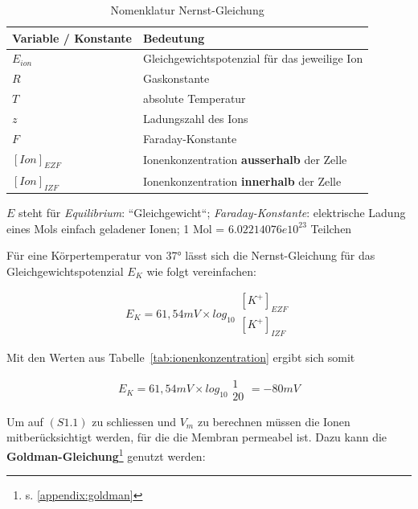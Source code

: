 {  {\renewcommand{\arraystretch}{1.5}%
\begin{table} %
 \centering
 \begin{tabular}{l |l }
  \textbf{Variable / Konstante} & \textbf{Bedeutung}  \\
  \hline
  $E_{ion}$            & Gleichgewichtspotenzial für das jeweilige Ion \\
  $R$                  & Gaskonstante \\
  $T$                  & absolute Temperatur \\
  $z$                  & Ladungszahl des Ions \\
  $F$                  & Faraday-Konstante \\
  $[Ion]_{EZF}$        & Ionenkonzentration \textbf{ausserhalb} der Zelle \\
  $[Ion]_{IZF}$        & Ionenkonzentration \textbf{innerhalb} der Zelle \\
 \end{tabular}
 \caption{Nomenklatur Nernst-Gleichung}
 \label{tab:nernstkonstanten}
 \small
  $E$ steht für \textit{Equilibrium}: ``Gleichgewicht``; \textit{Faraday-Konstante}: elektrische Ladung eines Mols einfach geladener Ionen; 1 Mol = $6.02214076e10^{23}$ Teilchen

\end{table}

\noindent
Für eine Körpertemperatur von 37° lässt sich die Nernst-Gleichung für das Gleichgewichtspotenzial $E_K$ wie folgt vereinfachen:

\begin{equation}
 E_{K} = 61,54 mV  \times log_{10} \begin{matrix} [K^+]_{EZF} \\ \hline [K^+]_{IZF} \end{matrix}
 \label{eq:gl-nernst-reduced-start}
\end{equation}

\noindent
Mit den Werten aus Tabelle~\ref{tab:ionenkonzentration}  ergibt sich somit


\begin{equation}
E_{K} = 61,54 mV  \times log_{10} \begin{matrix} 1 \\ \hline 20 \end{matrix} = -80 mV
\label{eq:gl-nernst-reduced-end}
\end{equation}

\noindent
Um auf $(S1.1)$ zu schliessen und $V_m$ zu berechnen müssen die Ionen mitberücksichtigt werden, für die die Membran permeabel ist.
Dazu kann die \textbf{Goldman-Gleichung}\footnote{
 s. \ref{appendix:goldman}
} genutzt werden:

}}
